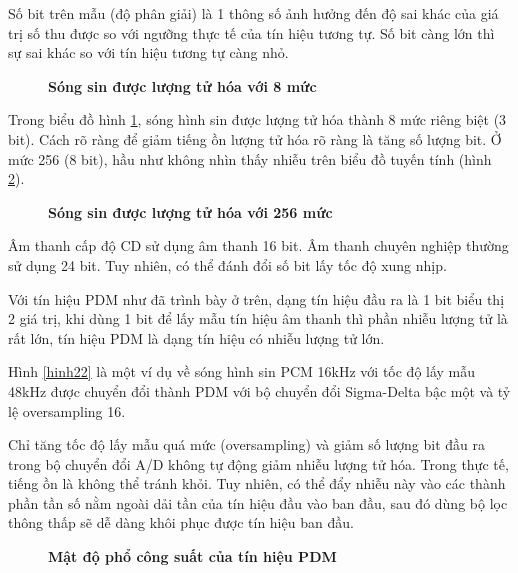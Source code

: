 Số bit trên mẫu (độ phân giải) là 1 thông số ảnh hưởng đến độ sai khác của giá trị số thu được so với ngưỡng thực tế của tín hiệu tương tự. Số bit càng lớn thì sự sai khác so với tín hiệu tương tự càng nhỏ.

\begin{figure}[!ht]
    \centering
    
    \caption[Sóng sin được lượng tử hóa với 8 mức]{\bfseries \fontsize{12pt}{0pt}\selectfont Sóng sin được lượng tử hóa với 8 mức}
    \label{h_quantization_noise_8}
\end{figure}
Trong biểu đồ hình \ref{h_quantization_noise_8}, sóng hình sin được lượng tử hóa thành 8 mức riêng biệt (3 bit). Cách rõ ràng để giảm tiếng ồn lượng tử hóa rõ ràng là tăng số lượng bit. Ở mức 256 (8 bit), hầu như không nhìn thấy nhiễu trên biểu đồ tuyến tính (hình \ref{h_quantization_noise_256}).

\begin{figure}[!ht]
    \centering
    
    \caption[Sóng sin được lượng tử hóa với 256 mức]{\bfseries \fontsize{12pt}{0pt}\selectfont Sóng sin được lượng tử hóa với 256 mức}
    \label{h_quantization_noise_256}
\end{figure}

Âm thanh cấp độ CD sử dụng âm thanh 16 bit. Âm thanh chuyên nghiệp thường sử dụng 24 bit. Tuy nhiên, có thể đánh đổi số bit lấy tốc độ xung nhịp.

Với tín hiệu PDM như đã trình bày ở trên, dạng tín hiệu đầu ra là 1 bit biểu thị 2 giá trị, khi dùng 1 bit để lấy mẫu tín hiệu âm thanh thì phần nhiễu lượng tử là rất lớn, tín hiệu PDM là dạng tín hiệu có nhiễu lượng tử lớn. 

Hình \ref{hinh22} là một ví dụ về sóng hình sin PCM 16kHz với tốc độ lấy mẫu 48kHz được chuyển đổi thành PDM với bộ chuyển đổi Sigma-Delta bậc một và tỷ lệ oversampling 16.

Chỉ tăng tốc độ lấy mẫu quá mức (oversampling) và giảm số lượng bit đầu ra trong bộ chuyển đổi A/D không tự động giảm nhiễu lượng tử hóa. Trong thực tế, tiếng ồn là không thể tránh khỏi. Tuy nhiên, có thể đẩy nhiễu này vào các thành phần tần số nằm ngoài dải tần của tín hiệu đầu vào ban đầu, sau đó dùng bộ lọc thông thấp sẽ dễ dàng khôi phục được tín hiệu ban đầu.
\begin{figure}[!ht]
    \centering
    
    \caption[Mật độ phổ công suất của tín hiệu PDM]{\bfseries \fontsize{12pt}{0pt}\selectfont Mật độ phổ công suất của tín hiệu PDM}
    \label{sinewave_pdm_psd}
\end{figure}

